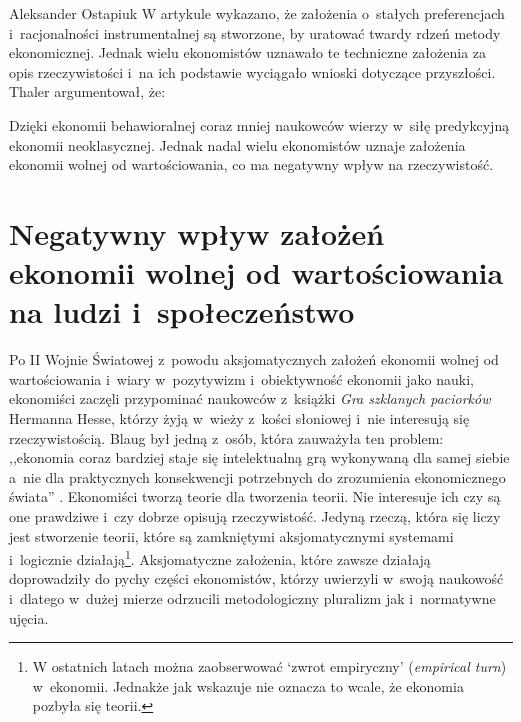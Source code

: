 \begin{artplenv}{Aleksander Ostapiuk}
W artykule wykazano, że założenia o~stałych preferencjach i~racjonalności instrumentalnej są stworzone, by uratować
twardy rdzeń metody ekonomicznej. Jednak wielu ekonomistów uznawało te techniczne założenia za opis rzeczywistości i~na
ich podstawie wyciągało wnioski dotyczące przyszłości. Thaler argumentował, że:

Dzięki ekonomii behawioralnej coraz mniej naukowców wierzy w~siłę predykcyjną ekonomii neoklasycznej. Jednak nadal wielu
ekonomistów uznaje założenia ekonomii wolnej od wartościowania, co ma negatywny wpływ na rzeczywistość. 

\section{Negatywny wpływ założeń ekonomii wolnej od wartościowania na ludzi i~społeczeństwo}
Po II Wojnie Światowej z~powodu aksjomatycznych założeń ekonomii wolnej od
wartościowania i~wiary w~pozytywizm i~obiektywność ekonomii jako nauki,
ekonomiści zaczęli przypominać naukowców z~książki \textit{Gra szklanych paciorków}
Hermanna Hesse, którzy żyją w~wieży z~kości słoniowej i~nie interesują się rzeczywistością. Blaug był jedną z~osób,
która zauważyła ten problem: ,,ekonomia coraz bardziej staje się intelektualną grą wykonywaną dla samej siebie a~nie dla
praktycznych konsekwencji potrzebnych do zrozumienia ekonomicznego świata''
\parencite[s.~3]{blaug_ugly_1997}.
Ekonomiści tworzą teorie dla tworzenia teorii.
Nie interesuje ich czy są one prawdziwe i~czy dobrze opisują rzeczywistość.
Jedyną rzeczą, która się liczy jest stworzenie teorii, które są zamkniętymi aksjomatycznymi
systemami i~logicznie działają\footnote{W ostatnich latach można zaobserwować `zwrot empiryczny'
(\textit{empirical turn}) w~ekonomii.
Jednakże jak wskazuje
\parencite{backhouse_age_2017}
nie oznacza to wcale, że ekonomia
pozbyła się teorii.}. Aksjomatyczne założenia, które zawsze działają doprowadziły do pychy części ekonomistów, którzy
uwierzyli w~swoją naukowość i~dlatego w~dużej mierze odrzucili metodologiczny pluralizm jak i~normatywne ujęcia.


\end{artplenv}
